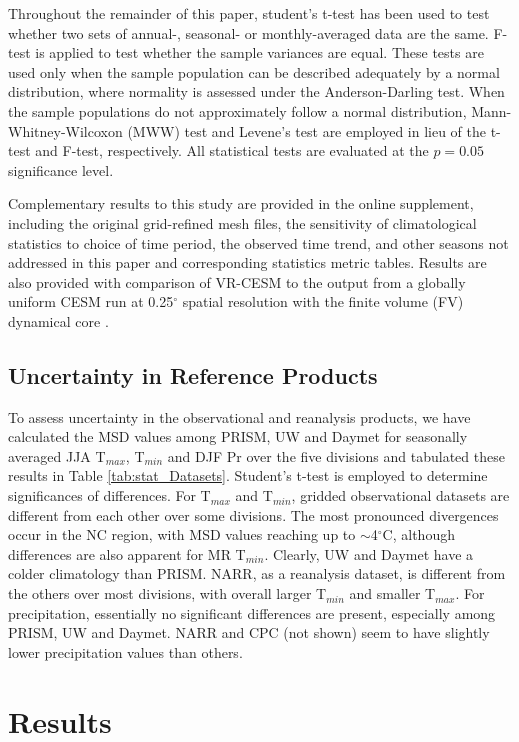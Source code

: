 \documentclass[ms,draft]{agutex}   %
\begin{document}
\begin{article}
Throughout the remainder of this paper, student's t-test has been used to test whether two sets of annual-, seasonal- or monthly-averaged data are the same. F-test is applied to test whether the sample variances are equal. These tests are used only when the sample population can be described adequately by a normal distribution, where normality is assessed under the Anderson-Darling test. When the sample populations do not approximately follow a normal distribution, Mann-Whitney-Wilcoxon (MWW) test and Levene's test are employed in lieu of the t-test and F-test, respectively. All statistical tests are evaluated at the $p = 0.05$ significance level.

Complementary results to this study are provided in the online supplement, including the original grid-refined mesh files, the sensitivity of climatological statistics to choice of time period, the observed time trend, and other seasons not addressed in this paper and corresponding statistics metric tables. Results are also provided with comparison of VR-CESM to the output from a globally uniform CESM run at 0.25$^\circ$ spatial resolution with the finite volume (FV) dynamical core \citep{wehner2014effect}.

\subsection{Uncertainty in Reference Products}

To assess uncertainty in the observational and reanalysis products, we have calculated the MSD values among PRISM, UW and Daymet for seasonally averaged JJA T$_{max}$, T$_{min}$ and DJF Pr over the five divisions and tabulated these results in Table \ref{tab:stat_Datasets}. Student's t-test is employed to determine significances of differences. For T$_{max}$ and T$_{min}$, gridded observational datasets are different from each other over some divisions.  The most pronounced divergences occur in the NC region, with MSD values reaching up to $\sim$4$^\circ$C, although differences are also apparent for MR T$_{min}$. Clearly, UW and Daymet have a colder climatology than PRISM. NARR, as a reanalysis dataset, is different from the others over most divisions, with overall larger T$_{min}$ and smaller T$_{max}$. For precipitation, essentially no significant differences are present, especially among PRISM, UW and Daymet. NARR and CPC (not shown) seem to have slightly lower precipitation values than others.

\section{Results}


\end{article}
\end{document}
